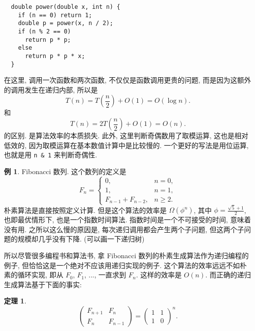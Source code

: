 \documentclass[a4paper]{ctexart}
\newtheorem{theorem}{定理}
\theoremstyle{definition}
\theoremstyle{definition}
\newtheorem{example}{例}[section]
\begin{document}
\begin{verbatim}
  double power(double x, int n) { 
    if (n == 0) return 1;
    double p = power(x, n / 2);
    if (n % 2 == 0)
      return p * p;
    else 
      return p * p * x;
  }
\end{verbatim}

在这里, 调用一次函数和两次函数, 不仅仅是函数调用更贵的问题, 而是因为这额外的调用发生在递归内部, 
所以是
\begin{equation}
  T(n) = T(\frac{n}{2}) + O(1) = O(\log n).
\end{equation}
和
\begin{equation}
  T(n) = 2T(\frac{n}{2}) + O(1) = O(n).
\end{equation}
的区别. 是算法效率的本质损失. 此外, 这里判断奇偶数用了取模运算, 这也是相对低效的, 
因为取模运算在基本数值计算中是比较慢的. 一个更好的写法是用位运算, 
也就是用 \verb|n & 1| 来判断奇偶性.

\begin{example}
  Fibonacci 数列. 这个数列的定义是 
  \begin{equation}
    F_n = \left\{
      \begin{array}{ll}
        0, & n = 0, \\
        1, & n = 1, \\
        F_{n - 1} + F_{n - 2}, & n \geq 2.
      \end{array}
    \right.
    \end{equation}
  朴素算法是直接按照定义计算. 但是这个算法的效率是 $\Omega(\phi^n)$, 其中 $\phi = \frac{\sqrt{5} + 1}{2}$, 
  也即最优情形下, 也是一个指数时间算法. 指数时间是一个不可接受的时间, 意味着没有用. 之所以这么慢的原因是, 每次递归调用都会产生两个子问题, 
  但这两个子问题的规模却几乎没有下降. (可以画一下递归树)
\end{example}

所以尽管很多编程书和算法书, 拿 Fibonacci 数列的朴素生成算法作为递归编程的例子, 但恰恰这是一个绝对不应该用递归实现的例子. 
这个算法的效率远远不如朴素的循环实现, 即从 $F_0$, $F_1$, $...$, 一直求到 $F_n$. 这样的效率是 $O(n)$.
而正确的递归生成算法基于下面的事实:

\begin{theorem}
\begin{equation}
  \left(
  \begin{array}{cc}
    F_{n + 1} & F_n \\
    F_n & F_{n - 1}
  \end{array}
  \right) = \left(
  \begin{array}{cc}
    1 & 1 \\
    1 & 0 
  \end{array}  
  \right)^n.
\end{equation}
\end{theorem}
\end{document}
